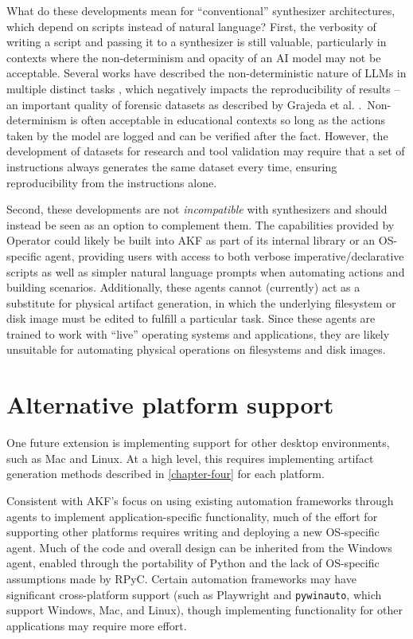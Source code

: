 \documentclass[letterpaper,12pt]{report}
\newcommand{\passthrough}[1]{#1}
\begin{document}
What do these developments mean for ``conventional'' synthesizer
architectures, which depend on scripts instead of natural language?
First, the verbosity of writing a script and passing it to a synthesizer
is still valuable, particularly in contexts where the non-determinism
and opacity of an AI model may not be acceptable. Several works have
described the non-deterministic nature of LLMs in multiple distinct
tasks
\cite{astekinExploratoryStudyHow2024,songGoodBadGreedy2024,ouyangEmpiricalStudyNonDeterminism2025},
which negatively impacts the reproducibility of results -- an important
quality of forensic datasets as described by Grajeda et al.
\cite{grajedaAvailabilityDatasetsDigital2017}.~Non-determinism is
often acceptable in educational contexts so long as the actions taken by
the model are logged and can be verified after the fact. However, the
development of datasets for research and tool validation may require
that a set of instructions always generates the same dataset every time,
ensuring reproducibility from the instructions alone.

Second, these developments are not \emph{incompatible} with synthesizers
and should instead be seen as an option to complement them. The
capabilities provided by Operator could likely be built into AKF as part
of its internal library or an OS-specific agent, providing users with
access to both verbose imperative/declarative scripts as well as simpler
natural language prompts when automating actions and building scenarios.
Additionally, these agents cannot (currently) act as a substitute for
physical artifact generation, in which the underlying filesystem or disk
image must be edited to fulfill a particular task. Since these agents
are trained to work with ``live'' operating systems and applications,
they are likely unsuitable for automating physical operations on
filesystems and disk images.

\section{Alternative platform
support}\label{alternative-platform-support}

One future extension is implementing support for other desktop
environments, such as Mac and Linux. At a high level, this requires
implementing artifact generation methods described in \autoref{chapter-four} for each platform.

Consistent with AKF's focus on using existing automation frameworks
through agents to implement application-specific functionality, much of
the effort for supporting other platforms requires writing and deploying
a new OS-specific agent. Much of the code and overall design can be
inherited from the Windows agent, enabled through the portability of
Python and the lack of OS-specific assumptions made by RPyC. Certain
automation frameworks may have significant cross-platform support (such
as Playwright and \passthrough{\lstinline!pywinauto!}, which support
Windows, Mac, and Linux), though implementing functionality for other
applications may require more effort.
\end{document}
